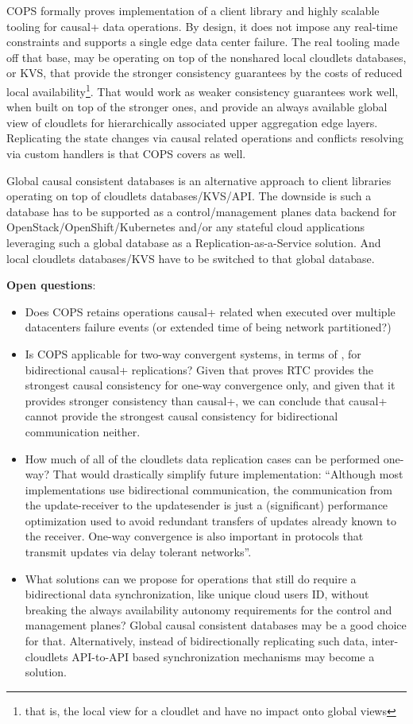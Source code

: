 \documentclass[conference]{IEEEtran}
\begin{document}
COPS formally proves implementation of a client library and highly scalable
tooling for causal+ data operations. By design, it does not impose any
real-time constraints and supports a single edge data center failure. The real
tooling made off that base, may be operating on top of the nonshared local
cloudlets databases, or KVS, that provide the stronger consistency guarantees
by the costs of reduced local availability\footnote{that is, the local view for
a cloudlet and have no impact onto global views}. That would work as weaker
consistency guarantees work well, when built on top of the stronger ones, and
provide an always available global view of cloudlets for hierarchically
associated upper aggregation edge layers. Replicating the state changes via
causal related operations and conflicts resolving via custom handlers is that
COPS covers as well.

Global causal consistent databases\cite{b6} is an alternative approach to
client libraries operating on top of cloudlets databases/KVS/API. The downside
is such a database has to be supported as a control/management planes data
backend for OpenStack/OpenShift/Kubernetes and/or any stateful cloud
applications leveraging such a global database as a Replication-as-a-Service
solution. And local cloudlets databases/KVS have to be switched to that global
database.

\textbf{Open questions}:
\begin{itemize}
  \item Does COPS retains operations causal+ related when executed over
    multiple datacenters failure events (or extended time of being network
    partitioned?)
  \item Is COPS applicable for two-way convergent systems, in terms of
    \cite{b2}, for bidirectional causal+ replications? Given that\cite{b1}
    proves RTC provides the strongest causal consistency for one-way
    convergence only, and given that it provides stronger consistency than
    causal+, we can conclude that causal+ cannot provide the strongest causal
    consistency for bidirectional communication neither.
  \item How much of all of the cloudlets data replication cases can be
    performed one-way? That would drastically simplify future implementation:
    ``Although most implementations use bidirectional communication, the
    communication from the update-receiver to the updatesender is just a
    (significant) performance optimization used to avoid redundant transfers of
    updates already known to the receiver. One-way convergence is also
    important in protocols that transmit updates via delay tolerant
    networks''\cite{b2}.
  \item What solutions can we propose for operations that still do require a
    bidirectional data synchronization, like unique cloud users ID, without
    breaking the always availability autonomy requirements for the control
    and management planes? Global causal consistent databases may be
    a good choice for that. Alternatively, instead of bidirectionally
    replicating such data, inter-cloudlets API-to-API based synchronization
    mechanisms may become a solution.
\end{itemize}
\end{document}
